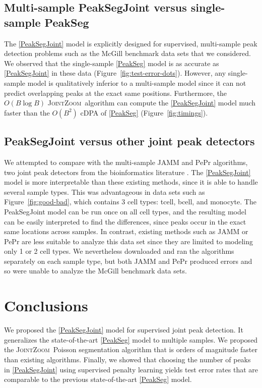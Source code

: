 \documentclass{article} %
\newcommand{\JointHeuristic}{\textsc{JointZoom}}
\begin{document}
\subsection{Multi-sample PeakSegJoint versus single-sample PeakSeg}

The \ref{PeakSegJoint} model is explicitly designed for supervised,
multi-sample peak detection problems such as the McGill benchmark data
sets that we considered. We observed that the single-sample
\ref{PeakSeg} model is as accurate as \ref{PeakSegJoint} in these data
(Figure~\ref{fig:test-error-dots}). However, any single-sample model
is qualitatively inferior to a multi-sample model since it can not
predict overlapping peaks at the exact same positions. Furthermore,
the $O(B \log B)$ \JointHeuristic\ algorithm can compute the
\ref{PeakSegJoint} model much faster than the $O(B^2)$ cDPA of
\ref{PeakSeg} (Figure~\ref{fig:timings}).

\subsection{PeakSegJoint versus other joint peak detectors}

We attempted to compare with the multi-sample JAMM and PePr
algorithms, two joint peak detectors from the bioinformatics
literature \citep{JAMM, PePr}. The \ref{PeakSegJoint} model is more
interpretable than these existing methods, since it is able to handle
several sample types. This was advantageous in data sets such as
Figure~\ref{fig:good-bad}, which contains 3 cell types: tcell, bcell,
and monocyte. The PeakSegJoint model can be run once on all cell
types, and the resulting model can be easily interpreted to find the
differences, since peaks occur in the exact same locations across
samples. In contrast, existing methods such as JAMM or PePr are less
suitable to analyze this data set since they are limited to modeling
only 1 or 2 cell types. We nevertheless downloaded and ran the
algorithms separately on each sample type, but both JAMM and PePr
produced errors and so were unable to analyze the McGill benchmark
data sets.

\section{Conclusions}
\label{sec:conclusions}

We proposed the \ref{PeakSegJoint} model for supervised joint peak
detection. It generalizes the state-of-the-art \ref{PeakSeg} model to
multiple samples. We proposed the \JointHeuristic\ Poisson
segmentation algorithm that is orders of magnitude faster than
existing algorithms. Finally, we showed that choosing the number of
peaks in \ref{PeakSegJoint} using supervised penalty learning yields
test error rates that are comparable to the previous state-of-the-art
\ref{PeakSeg} model.
\end{document}
